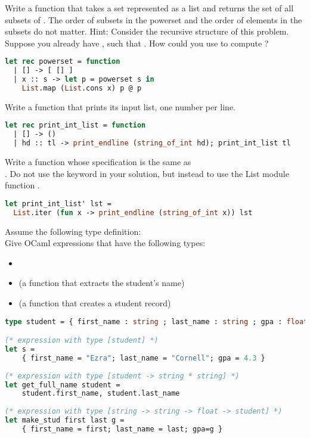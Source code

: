 \problem[powerset]
Write a function  that takes a set  represented as a list and returns the set of all subsets of . The order of subsets in the powerset and the order of elements in the subsets do not matter.
Hint: Consider the recursive structure of this problem. Suppose you already have , such that . How could you use  to compute ?

\begin{lstlisting}[language=OCaml]
let rec powerset = function
  | [] -> [ [] ]
  | x :: s -> let p = powerset s in
    List.map (List.cons x) p @ p
\end{lstlisting}

Write a function  that prints its input list, one number per line.

\begin{lstlisting}[language=OCaml]
let rec print_int_list = function
  | [] -> ()
  | hd :: tl -> print_endline (string_of_int hd); print_int_list tl
\end{lstlisting}

Write a function  whose specification is the same as \\
. Do not use the keyword  in your solution, but instead to use the List module function .

\begin{lstlisting}[language=OCaml]
let print_int_list' lst =
  List.iter (fun x -> print_endline (string_of_int x)) lst
\end{lstlisting}

\problem[student]
Assume the following type definition:
 \\
Give OCaml expressions that have the following types:
\begin{itemize}
	\item {}
	\item {} (a function that extracts the student's name)
	\item {} (a function that creates a student record)
\end{itemize}

\begin{lstlisting}[language=OCaml]
type student = { first_name : string ; last_name : string ; gpa : float }

(* expression with type [student] *)
let s =
	{ first_name = "Ezra"; last_name = "Cornell"; gpa = 4.3 }
	
(* expression with type [student -> string * string] *)
let get_full_name student =
	student.first_name, student.last_name
	
(* expression with type [string -> string -> float -> student] *)
let make_stud first last g =
	{ first_name = first; last_name = last; gpa=g }
\end{lstlisting}


